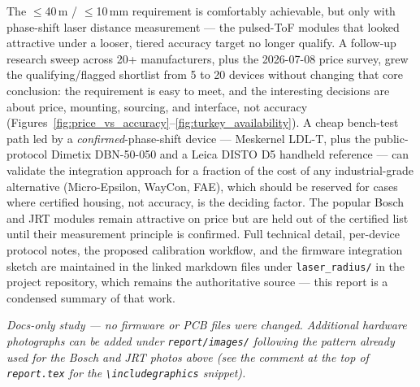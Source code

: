 \documentclass[11pt]{article}
\begin{document}
The $\leq$40\,m / $\leq$10\,mm requirement is comfortably achievable, but only with phase-shift laser distance measurement --- the pulsed-ToF modules that looked attractive under a looser, tiered accuracy target no longer qualify. A follow-up research sweep across 20+ manufacturers, plus the 2026-07-08 price survey, grew the qualifying/flagged shortlist from 5 to 20 devices without changing that core conclusion: the requirement is easy to meet, and the interesting decisions are about price, mounting, sourcing, and interface, not accuracy (Figures~\ref{fig:price_vs_accuracy}--\ref{fig:turkey_availability}). A cheap bench-test path led by a \emph{confirmed}-phase-shift device --- Meskernel LDL-T, plus the public-protocol Dimetix DBN-50-050 and a Leica DISTO D5 handheld reference --- can validate the integration approach for a fraction of the cost of any industrial-grade alternative (Micro-Epsilon, WayCon, FAE), which should be reserved for cases where certified housing, not accuracy, is the deciding factor. The popular Bosch and JRT modules remain attractive on price but are held out of the certified list until their measurement principle is confirmed. Full technical detail, per-device protocol notes, the proposed calibration workflow, and the firmware integration sketch are maintained in the linked markdown files under \texttt{laser\_radius/} in the project repository, which remains the authoritative source --- this report is a condensed summary of that work.

\vspace{1em}
\noindent\textit{Docs-only study --- no firmware or PCB files were changed. Additional hardware photographs can be added under \texttt{report/images/} following the pattern already used for the Bosch and JRT photos above (see the comment at the top of \texttt{report.tex} for the \texttt{\textbackslash includegraphics} snippet).}
\end{document}
